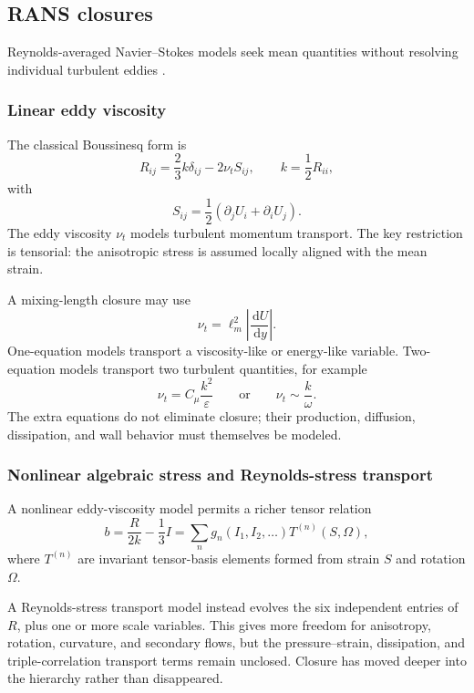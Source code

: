 \documentclass[11pt]{article}
\newcommand{\dd}{\,\mathrm{d}}
\begin{document}
\subsection{RANS closures}

Reynolds-averaged Navier--Stokes models seek mean quantities without resolving individual turbulent eddies \citep{pope2000turbulent}.

\subsubsection{Linear eddy viscosity}

The classical Boussinesq form is
\begin{equation}
R_{ij}
=\frac{2}{3}k\delta_{ij}-2\nu_t S_{ij},
\qquad
k=\frac12R_{ii},
\end{equation}
with
\[
S_{ij}=\frac12(\partial_jU_i+\partial_iU_j).
\]
The eddy viscosity \(\nu_t\) models turbulent momentum transport. The key restriction is tensorial: the anisotropic stress is assumed locally aligned with the mean strain.

A mixing-length closure may use
\[
\nu_t=\ell_m^2\left|\frac{\dd U}{\dd y}\right|.
\]
One-equation models transport a viscosity-like or energy-like variable. Two-equation models transport two turbulent quantities, for example
\[
\nu_t=C_\mu\frac{k^2}{\varepsilon}
\qquad\text{or}\qquad
\nu_t\sim\frac{k}{\omega}.
\]
The extra equations do not eliminate closure; their production, diffusion, dissipation, and wall behavior must themselves be modeled.

\subsubsection{Nonlinear algebraic stress and Reynolds-stress transport}

A nonlinear eddy-viscosity model permits a richer tensor relation
\begin{equation}
b
=\frac{R}{2k}-\frac13I
=\sum_n g_n(I_1,I_2,\ldots)T^{(n)}(S,\Omega),
\end{equation}
where \(T^{(n)}\) are invariant tensor-basis elements formed from strain \(S\) and rotation \(\Omega\).

A Reynolds-stress transport model instead evolves the six independent entries of \(R\), plus one or more scale variables. This gives more freedom for anisotropy, rotation, curvature, and secondary flows, but the pressure--strain, dissipation, and triple-correlation transport terms remain unclosed. Closure has moved deeper into the hierarchy rather than disappeared.
\end{document}
